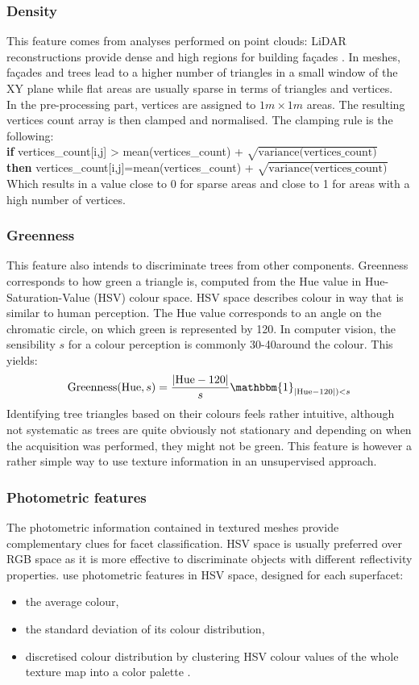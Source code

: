 \documentclass{kththesis}
\begin{document}
\subsubsection{Density}
This feature comes from analyses performed on point clouds: LiDAR reconstructions provide dense and high regions for building façades \parencite{Finnish3Dpc}. In meshes, façades and trees lead to a higher number of triangles in a small window of the XY plane while flat areas are usually sparse in terms of triangles and vertices. \\ 
In the pre-processing part, vertices are assigned to $1m\times1m$ areas. The resulting vertices count array is then clamped and normalised. The clamping rule is the following: \\

\textbf{if} vertices\_count[i,j] > mean(vertices\_count) + $\sqrt{\text{variance(vertices\_count)}}$ \\
\textbf{then} vertices\_count[i,j]=mean(vertices\_count) + $\sqrt{\text{variance(vertices\_count)}}$\\

Which results in a value close to 0 for sparse areas and close to 1 for areas with a high number of vertices. 
\subsubsection{Greenness}
This feature also intends to discriminate trees from other components. Greenness corresponds to how green a triangle is, computed from the Hue value in Hue-Saturation-Value (HSV) colour space. HSV space describes colour in way that is similar to human perception. The Hue value corresponds to an angle on the chromatic circle, on which green is represented by 120\degree. In computer vision, the sensibility $s$ for a colour perception is commonly 30-40\degree around the colour. This yields: \\
$$\text{Greenness}(\text{Hue}, s)=\frac{|\text{Hue}-120|}{s} \mathbbm{1}_{|\text{Hue}-120|)<s} $$
Identifying tree triangles based on their colours feels rather intuitive, although not systematic as trees are quite obviously not stationary and depending on when the acquisition was performed, they might not be green. This feature is however a rather simple way to use texture information in an unsupervised approach. 
\subsubsection{Photometric features}
The photometric information contained in textured
meshes provide complementary clues for facet classification. HSV space is usually preferred over RGB space as it is more effective to discriminate objects with different reflectivity properties. \textcite{rouhani} use photometric features in HSV space, designed for each superfacet:
\begin{itemize}
    \item the average colour,
    \item the standard deviation of its colour distribution,
    \item discretised colour distribution by clustering HSV colour values of the whole texture map into a color palette \parencite{color_palette}.
\end{itemize}
\end{document}
